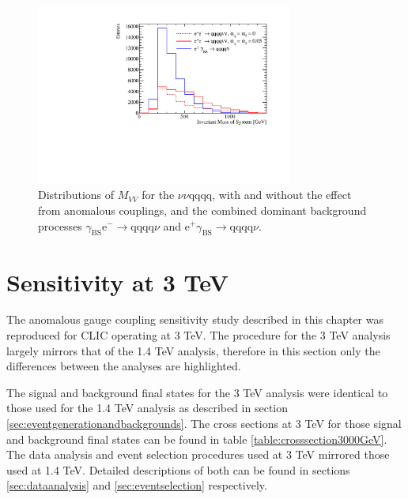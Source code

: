 \begin{figure}[h!]
\centering
\includegraphics[width=0.75\textwidth]{PhysicsAnalysis/Plots/NuisanceFit/1400GeV/NuisanceExplanation.pdf}
\caption[Distributions of $M_{VV}$ for the $\nu\nu\text{qqqq}$, with and without the effect from anomalous couplings, and the combined dominant background processes $\gamma_{\text{BS}}\text{e}^{-} \rightarrow \text{qqqq}\nu$ and $\text{e}^{+}\gamma_{\text{BS}} \rightarrow \text{qqqq}\nu$.]{Distributions of $M_{VV}$ for the $\nu\nu\text{qqqq}$, with and without the effect from anomalous couplings, and the combined dominant background processes $\gamma_{\text{BS}}\text{e}^{-} \rightarrow \text{qqqq}\nu$ and $\text{e}^{+}\gamma_{\text{BS}} \rightarrow \text{qqqq}\nu$.}
\label{fig:nuisanceexplanation1400GeV}
\end{figure}



\section{Sensitivity at 3 TeV}

The anomalous gauge coupling sensitivity study described in this chapter was reproduced for CLIC operating at 3 TeV.  The procedure for the 3 TeV analysis largely mirrors that of the 1.4 TeV analysis, therefore in this section only the differences between the analyses are highlighted.  

The signal and background final states for the 3 TeV analysis were identical to those used for the 1.4 TeV analysis as described in section \ref{sec:eventgenerationandbackgrounds}.  The cross sections at 3 TeV for those signal and background final states can be found in table \ref{table:crosssection3000GeV}.  The data analysis and event selection procedures used at 3 TeV mirrored those used at 1.4 TeV.  Detailed descriptions of both can be found in sections \ref{sec:dataanalysis} and \ref{sec:eventselection} respectively.  

